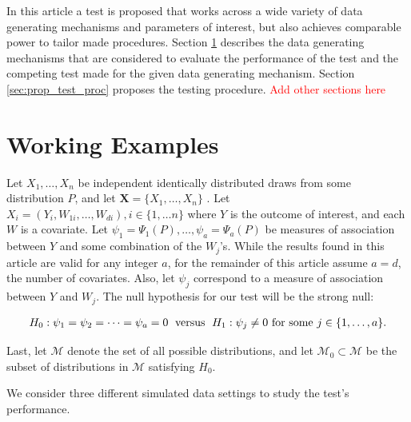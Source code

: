 \documentclass{article}
\newcommand{\sh}{\textcolor{red}}
\newcommand{\rvo}{X}
\newcommand{\disto}{P}
\begin{document}
In this article a test is proposed that works across a wide variety of data generating mechanisms and parameters of interest, but also achieves comparable power to tailor made procedures. Section \ref{sec:Working Examples} describes the data generating mechanisms that are considered to evaluate the performance of the test and the competing test made for the given data generating mechanism.  Section \ref{sec:prop_test_proc} proposes the testing procedure. \sh{Add other sections here}  

\section{Working Examples}
\label{sec:Working Examples}
Let $\rvo_1, \dots, \rvo_n$ be independent identically distributed draws from some distribution $\disto$, and let $\boldsymbol{\rvo} = \{\rvo_1, \dots, \rvo_n\}$ . Let $\rvo_i = \left(Y_i, W_{1 i}, \dots, W_{d i}\right), i \in \{1, \dots n\}$ where $Y$ is the outcome of interest, and each $W$ is a covariate. Let $\psi_1 = \Psi_1(\disto), \dots, \psi_a = \Psi_a(\disto)$ be measures of association between $Y$ and some combination of the $W_j$'s.  While the results found in this article are valid for any integer $a$, for the remainder of this article assume $a = d$, the number of covariates. Also, let $\psi_j$ correspond to a measure of association between $Y$ and $W_j$.  The null hypothesis for our test will be the strong null: 

\begin{align*}
H_0: \psi_1 = \psi_2 = \dots = \psi_a = 0 \hspace{0.1cm}\text{  versus  } \hspace{0.1cm} H_1: \psi_j \neq 0 \text{ for some } j \in \{1, \dots, a\}.
\end{align*}

Last, let $\mathscr{M}$ denote the set of all possible distributions, and let $\mathscr{M}_0  \subset \mathscr{M}$ be the subset of distributions in $\mathscr{M}$ satisfying $H_0$.

We consider three different simulated data settings to study the test's performance. 
\end{document}
